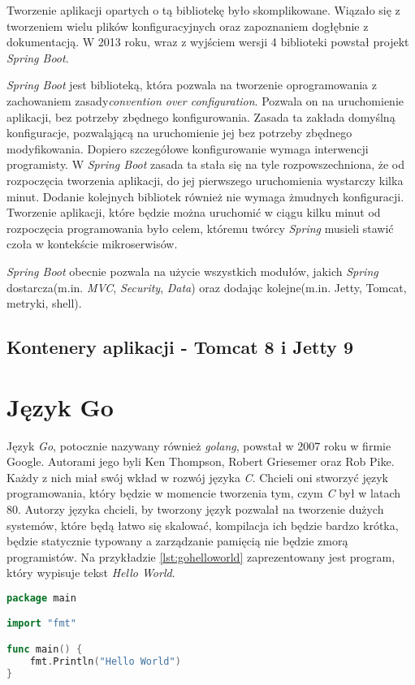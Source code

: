 Tworzenie aplikacji opartych o tą bibliotekę było skomplikowane. Wiązało się z tworzeniem wielu plików konfiguracyjnych oraz zapoznaniem dogłębnie z dokumentacją. W 2013 roku, wraz z wyjściem wersji 4 biblioteki powstał projekt \textsl{Spring Boot}. 

\textsl{Spring Boot} jest biblioteką, która pozwala na tworzenie oprogramowania z zachowaniem zasady\textsl{convention over configuration}. Pozwala on na uruchomienie aplikacji, bez potrzeby zbędnego konfigurowania. Zasada ta zakłada domyślną konfiguracje, pozwaląjącą na uruchomienie jej bez potrzeby zbędnego modyfikowania. Dopiero szczegółowe konfigurowanie wymaga interwencji programisty. W \textsl{Spring Boot} zasada ta stała się na tyle rozpowszechniona, że od rozpoczęcia tworzenia aplikacji, do jej pierwszego uruchomienia wystarczy kilka minut. Dodanie kolejnych bibliotek również nie wymaga żmudnych konfiguracji. Tworzenie aplikacji, które będzie można uruchomić w ciągu kilku minut od rozpoczęcia programowania było celem, któremu twórcy \textsl{Spring} musieli stawić czoła w kontekście mikroserwisów. 

\textsl{Spring Boot} obecnie pozwala na użycie wszystkich modułów, jakich \textsl{Spring} dostarcza(m.in. \textsl{MVC}, \textsl{Security}, \textsl{Data}) oraz dodając kolejne(m.in. Jetty, Tomcat, metryki, shell). 

\subsection{Kontenery aplikacji - Tomcat 8 i Jetty 9} 

\section{Język Go}
Język \textsl{Go}, potocznie nazywany również \textsl{golang}, powstał w 2007 roku w firmie Google. Autorami jego byli Ken Thompson, Robert Griesemer oraz Rob Pike\cite{programmingingo}. Każdy z nich miał swój wkład w rozwój języka \textsl{C}. Chcieli oni stworzyć język programowania, który będzie w momencie tworzenia tym, czym \textsl{C} był w latach 80. Autorzy języka chcieli, by tworzony język pozwalał na tworzenie dużych systemów, które będą łatwo się skalować, kompilacja ich będzie bardzo krótka, będzie statycznie typowany a zarządzanie pamięcią nie będzie zmorą programistów. Na przykładzie \ref{lst:gohelloworld} zaprezentowany jest program, który wypisuje tekst \textsl{Hello World}.
\begin{lstlisting}[language=Go, caption={Przykład programu w języku Go}, label={lst:gohelloworld}]
package main

import "fmt"

func main() {
	fmt.Println("Hello World")
}
\end{lstlisting}

